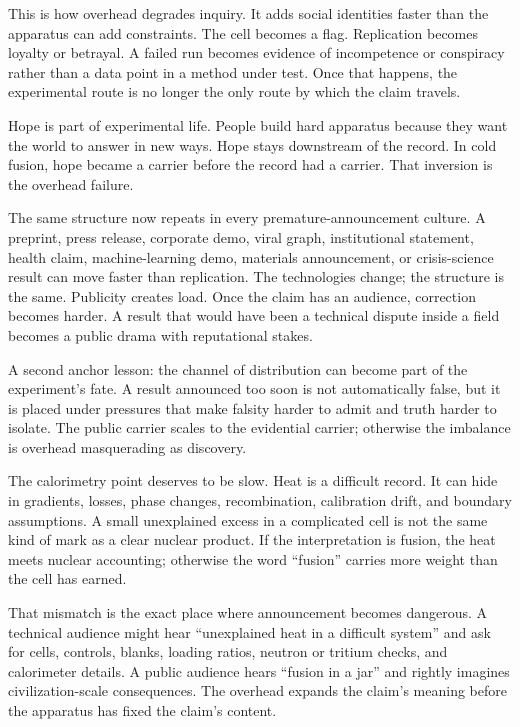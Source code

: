 This is how overhead degrades inquiry. It adds social identities faster
than the apparatus can add constraints. The cell becomes a flag.
Replication becomes loyalty or betrayal. A failed run becomes evidence of
incompetence or conspiracy rather than a data point in a method under
test. Once that happens, the experimental route is no longer the only
route by which the claim travels.

Hope is part of experimental life. People build hard apparatus because
they want the world to answer in new ways. Hope stays downstream of the
record. In cold fusion, hope became a carrier before the record had a
carrier. That inversion is the overhead failure.

The same structure now repeats in every premature-announcement culture. A
preprint, press release, corporate demo, viral graph, institutional
statement, health claim, machine-learning demo, materials announcement,
or crisis-science result can move faster than replication. The
technologies change; the structure is the same. Publicity creates load.
Once the claim has an audience, correction becomes harder. A result that
would have been a technical dispute inside a field becomes a public
drama with reputational stakes.

A second anchor lesson: the channel of distribution can become part of
the experiment's fate. A result announced too soon is not automatically
false, but it is placed under pressures that make falsity harder to admit
and truth harder to isolate. The public carrier scales to the evidential
carrier; otherwise the imbalance is overhead masquerading as discovery.

The calorimetry point deserves to be slow. Heat is a difficult record. It
can hide in gradients, losses, phase changes, recombination, calibration
drift, and boundary assumptions. A small unexplained excess in a
complicated cell is not the same kind of mark as a clear nuclear product.
If the interpretation is fusion, the heat meets nuclear accounting;
otherwise the word ``fusion'' carries more weight than the cell has
earned.

That mismatch is the exact place where announcement becomes dangerous. A
technical audience might hear ``unexplained heat in a difficult system''
and ask for cells, controls, blanks, loading ratios, neutron or tritium
checks, and calorimeter details. A public audience hears ``fusion in a
jar'' and rightly imagines civilization-scale consequences. The overhead
expands the claim's meaning before the apparatus has fixed the claim's
content.

